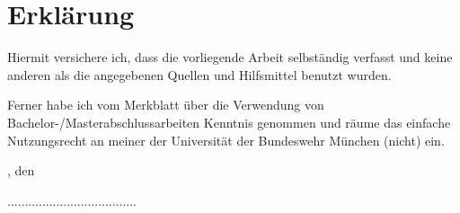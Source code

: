 
\chapter*{Erklärung}
Hiermit versichere ich, dass die vorliegende Arbeit selbständig verfasst und keine anderen als die angegebenen Quellen und Hilfsmittel benutzt wurden.

Ferner habe ich vom Merkblatt über die Verwendung von Bachelor-/Masterabschlussarbeiten \linebreak Kenntnis genommen und räume das einfache Nutzungsrecht an meiner \DocumentType der Universität der Bundeswehr München (nicht) ein.

\vspace{3cm}

\SubmissionLocation, den \SubmissionDate

\vspace{1cm}

.....................................

\Author
